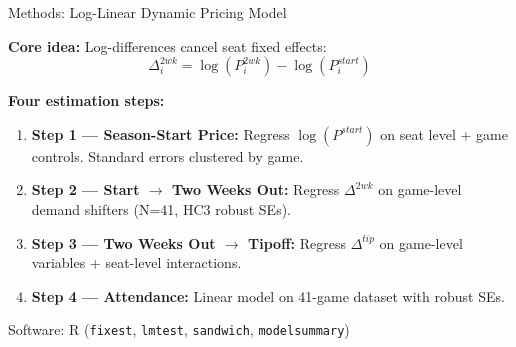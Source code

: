 \documentclass{beamer}
\begin{document}
\begin{frame}{Methods: Log-Linear Dynamic Pricing Model}

\textbf{Core idea:} Log-differences cancel seat fixed effects:
$$\Delta^{2wk}_i = \log(P^{2wk}_i) - \log(P^{start}_i)$$

\vspace{0.3cm}
\textbf{Four estimation steps:}

\begin{enumerate}
    \item \textbf{Step 1 — Season-Start Price:} Regress $\log(P^{start})$ on seat level + game controls. Standard errors clustered by game.

    \item \textbf{Step 2 — Start $\to$ Two Weeks Out:} Regress $\Delta^{2wk}$ on game-level demand shifters (N=41, HC3 robust SEs).

    \item \textbf{Step 3 — Two Weeks Out $\to$ Tipoff:} Regress $\Delta^{tip}$ on game-level variables + seat-level interactions.

    \item \textbf{Step 4 — Attendance:} Linear model on 41-game dataset with robust SEs.
\end{enumerate}

\vspace{0.2cm}
\small Software: R (\texttt{fixest}, \texttt{lmtest}, \texttt{sandwich}, \texttt{modelsummary})

\end{frame}
\end{document}
